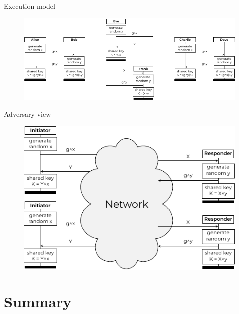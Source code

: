 \documentclass[11pt,aspectratio=169]{beamer}
\begin{document}
\begin{frame}[fragile]{Execution model}
    \begin{figure}
        \includegraphics[width=\textwidth]{./figures/lecture_0/dh_exe}
    \end{figure}
\end{frame}

\begin{frame}[fragile]{Adversary view}
    \begin{figure}
        \includegraphics[width=.7\textwidth]{./figures/lecture_0/dh_adv}
    \end{figure}
\end{frame}


\section{Summary}

\end{document}
